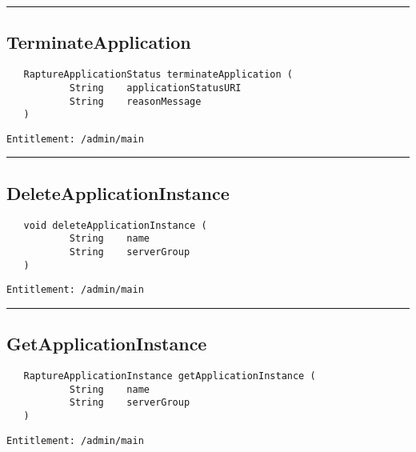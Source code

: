 \rule{12cm}{2pt}
\subsection{TerminateApplication}
\label{Api:TerminateApplication}
\begin{Verbatim}
   RaptureApplicationStatus terminateApplication (
           String    applicationStatusURI
           String    reasonMessage
   )
\end{Verbatim}
\begin{Verbatim}[formatcom=\color{Maroon}]
  Entitlement: /admin/main
\end{Verbatim}



\rule{12cm}{2pt}
\subsection{DeleteApplicationInstance}
\label{Api:DeleteApplicationInstance}
\begin{Verbatim}
   void deleteApplicationInstance (
           String    name
           String    serverGroup
   )
\end{Verbatim}
\begin{Verbatim}[formatcom=\color{Maroon}]
  Entitlement: /admin/main
\end{Verbatim}



\rule{12cm}{2pt}
\subsection{GetApplicationInstance}
\label{Api:GetApplicationInstance}
\begin{Verbatim}
   RaptureApplicationInstance getApplicationInstance (
           String    name
           String    serverGroup
   )
\end{Verbatim}
\begin{Verbatim}[formatcom=\color{Maroon}]
  Entitlement: /admin/main
\end{Verbatim}




